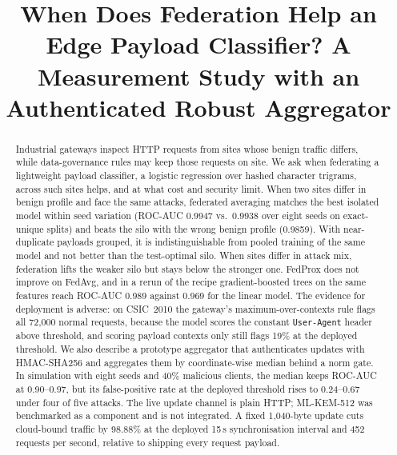 \documentclass[conference]{IEEEtran}
\begin{document}
\title{When Does Federation Help an Edge Payload Classifier? A Measurement Study with an Authenticated Robust Aggregator}

\author{
}

\maketitle

\begin{abstract}
Industrial gateways inspect HTTP requests from sites whose benign traffic differs, while data-governance rules may keep those requests on site. We ask when federating a lightweight payload classifier, a logistic regression over hashed character trigrams, across such sites helps, and at what cost and security limit. When two sites differ in benign profile and face the same attacks, federated averaging matches the best isolated model within seed variation (ROC-AUC 0.9947 vs.\ 0.9938 over eight seeds on exact-unique splits) and beats the silo with the wrong benign profile (0.9859). With near-duplicate payloads grouped, it is indistinguishable from pooled training of the same model and not better than the test-optimal silo. When sites differ in attack mix, federation lifts the weaker silo but stays below the stronger one. FedProx does not improve on FedAvg, and in a rerun of the recipe gradient-boosted trees on the same features reach ROC-AUC 0.989 against 0.969 for the linear model. The evidence for deployment is adverse: on CSIC~2010 the gateway's maximum-over-contexts rule flags all 72{,}000 normal requests, because the model scores the constant \texttt{User-Agent} header above threshold, and scoring payload contexts only still flags 19\% at the deployed threshold. We also describe a prototype aggregator that authenticates updates with HMAC-SHA256 and aggregates them by coordinate-wise median behind a norm gate. In simulation with eight seeds and 40\% malicious clients, the median keeps ROC-AUC at 0.90--0.97, but its false-positive rate at the deployed threshold rises to 0.24--0.67 under four of five attacks. The live update channel is plain HTTP; ML-KEM-512 was benchmarked as a component and is not integrated. A fixed 1{,}040-byte update cuts cloud-bound traffic by 98.88\% at the deployed 15\,s synchronisation interval and 452 requests per second, relative to shipping every request payload.
\end{abstract}
\end{document}
